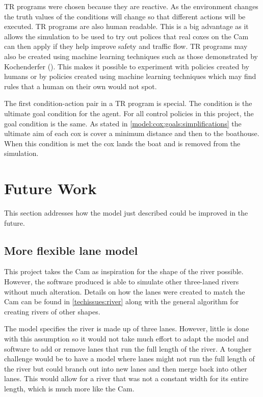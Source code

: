       TR programs were chosen because they are reactive. As the environment changes the truth values of the conditions will change so that different actions will be executed. TR programs are also human readable. This is a big advantage as it allows the simulation to be used to try out polices that real coxes on the Cam can then apply if they help improve safety and traffic flow. TR programs may also be created using machine learning techniques such as those demonstrated by Kochenderfer (\cite{Kochenderfer2003}). This makes it possible to experiment with policies created by humans or by policies created using machine learning techniques which may find rules that a human on their own would not spot.
      
      The first condition-action pair in a TR program is special. The condition is the ultimate goal condition for the agent. For all control policies in this project, the goal condition is the same. As stated in \ref{model:cox:goals:simplifications} the ultimate aim of each cox is cover a minimum distance and then to the boathouse. When this condition is met the cox lands the boat and is removed from the simulation.

\section{Future Work}
This section addresses how the model just described could be improved in the future. 

\subsection{More flexible lane model}
This project takes the Cam as inspiration for the shape of the river possible. However, the software produced is able to simulate other three-laned rivers without much alteration. Details on how the lanes were created to match the Cam can be found in \ref{techissues:river} along with the general algorithm for creating rivers of other shapes. 

The model specifies the river is made up of three lanes. However, little is done with this assumption so it would not take much effort to adapt the model and software to add or remove lanes that run the full length of the river. A tougher challenge would be to have a model where lanes might not run the full length of the river but could branch out into new lanes and then merge back into other lanes. This would allow for a river that was not a constant width for its entire length, which is much more like the Cam.

